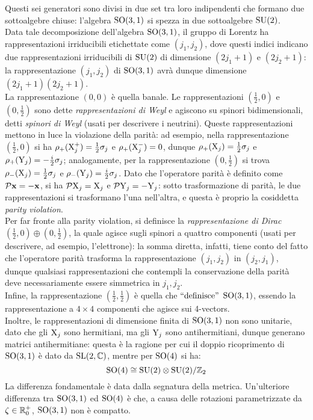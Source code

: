 Questi sei generatori sono divisi in due set tra loro indipendenti che formano due sottoalgebre chiuse: l'algebra $ \mathrm{SO}(3,1) $ si spezza in due sottoalgebre $ \mathrm{SU}(2) $.\\
Data tale decomposizione dell'algebra $ \mathrm{SO}(3,1) $, il gruppo di Lorentz ha rappresentazioni irriducibili etichettate come $ \left( j_1,j_2 \right) $, dove questi indici indicano due rappresentazioni irriducibili di $ \mathrm{SU}(2) $ di dimensione $ (2j_1 + 1) $ e $ (2j_2 + 1) $: la rappresentazione $ (j_1,j_2) $ di $ \mathrm{SO}(3,1) $ avrà dunque dimensione $ (2j_1 + 1)(2j_2 + 1) $.\\
La rappresentazione $ (0,0) $ è quella banale. Le rappresentazioni $ (\frac{1}{2},0) $ e $ (0,\frac{1}{2}) $ sono dette \textit{rappresentazioni di Weyl} e agiscono su spinori bidimensionali, detti \textit{spinori di Weyl} (usati per descrivere i neutrini). Queste rappresentazioni mettono in luce la violazione della parità: ad esempio, nella rappresentazione $ (\frac{1}{2},0) $ si ha $ \rho_+(\mathrm{X}^+_j) = \frac{1}{2} \sigma_j $ e $ \rho_+(\mathrm{X}^-_j) = 0 $, dunque $ \rho_+(\mathrm{X}_j) = \frac{1}{2} \sigma_j $ e $ \rho_+(\mathrm{Y}_j) = - \frac{i}{2} \sigma_j $; analogamente, per la rappresentazione $ (0,\frac{1}{2}) $ si trova $ \rho_-(\mathrm{X}_j) = \frac{1}{2} \sigma_j $ e $ \rho_-(\mathrm{Y}_j) = \frac{i}{2} \sigma_j $. Dato che l'operatore parità è definito come $ \mathcal{P}\mathbf{x} = - \mathbf{x} $, si ha $ \mathcal{P}\mathrm{X}_j = \mathrm{X}_j $ e $ \mathcal{P}\mathrm{Y}_j = -\mathrm{Y}_j $: sotto trasformazione di parità, le due rappresentazioni si trasformano l'una nell'altra, e questa è proprio la cosiddetta \textit{parity violation}.\\
Per far fronte alla parity violation, si definisce la \textit{rappresentazione di Dirac} $ (\frac{1}{2},0) \oplus (0,\frac{1}{2}) $, la quale agisce sugli spinori a quattro componenti (usati per descrivere, ad esempio, l'elettrone): la somma diretta, infatti, tiene conto del fatto che l'operatore parità trasforma la rappresentazione $ (j_1,j_2) $ in $ (j_2,j_1) $, dunque qualsiasi rappresentazioni che contempli la conservazione della parità deve necessariamente essere simmetrica in $ j_1,j_2 $.\\
Infine, la rappresentazione $ (\frac{1}{2},\frac{1}{2}) $ è quella che $ ``\text{definisce}" $ $ \mathrm{SO}(3,1) $, essendo la rappresentazione a $ 4 \times 4 $ componenti che agisce sui 4-vectors.\\
Inoltre, le rappresentazioni di dimensione finita di $ \mathrm{SO}(3,1) $ non sono unitarie, dato che gli $ \mathrm{X}_j $ sono hermitiani, ma gli $ \mathrm{Y}_j $ sono antihermitiani, dunque generano matrici antihermitiane: questa è la ragione per cui il doppio ricoprimento di $ \mathrm{SO}(3,1) $ è dato da $ \mathrm{SL}(2,\mathbb{C}) $, mentre per $ \mathrm{SO}(4) $ si ha:
\begin{equation}
	\mathrm{SO}(4) \cong \mathrm{SU}(2) \otimes \mathrm{SU}(2) / \mathbb{Z}_2
	\label{eq:10.29}
\end{equation}
La differenza fondamentale è data dalla segnatura della metrica. Un'ulteriore differenza tra $ \mathrm{SO}(3,1) $ ed $ \mathrm{SO}(4) $ è che, a causa delle rotazioni parametrizzate da $ \zeta \in \mathbb{R}^+_0 $, $ \mathrm{SO}(3,1) $ non è compatto.

